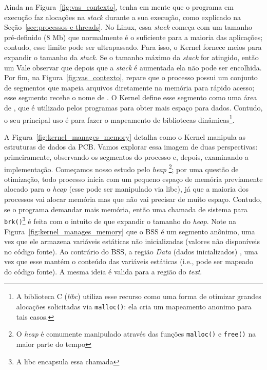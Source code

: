 Ainda na Figura~\ref{fig:vas_contexto}, tenha em mente que o programa em
execução faz alocações na \emph{stack} durante a sua execução, como explicado
na Seção~\ref{sec:processos-e-threads}. No Linux, essa \textit{stack} começa
com um tamanho pré-definido (8 Mb) que normalmente é o suficiente para a
maioria das aplicações; contudo, esse limite pode ser ultrapassado. Para isso, o
Kernel fornece meios para expandir o tamanho da \emph{stack}. Se o tamanho
máximo da \textit{stack} for atingido, então um 
 Vale observar que depois que a \textit{stack} é aumentada ela não pode
ser encolhida. Por fim, na Figura~\ref{fig:vas_contexto}, repare que o processo
possui um conjunto de segmentos que mapeia arquivos diretamente na memória para
rápido acesso; esse segmento recebe o nome de . O Kernel define esse segmento como uma área de
, que é utilizado pelos programas
para obter mais espaço para dados. Contudo, o seu principal uso é para fazer o
mapeamento de bibliotecas dinâmicas\footnote{A biblioteca C (\textit{libc})
utiliza esse recurso como uma forma de otimizar grandes alocações solicitadas
via \texttt{malloc()}: ela cria um mapeamento anonimo para tais
casos.}.

A Figura~\ref{fig:kernel_manages_memory} detalha
como o Kernel manipula as estruturas de dados da PCB. Vamos explorar essa
imagem de duas perspectivas: primeiramente, observando os segmentos do processo
e, depois, examinando a implementação. Começamos nosso estudo pelo \textit{heap}
\footnote{O \emph{heap} é comumente manipulado através das funções \texttt{malloc()} e
\texttt{free()} na maior parte do tempo}; por uma questão de otimização, todo
processo inicia com um pequeno espaço de memória previamente alocado para o \textit{heap}
(esse pode ser manipulado via libc), já que a maioria dos
processos vai alocar memória mas que não vai precisar de muito espaço.
Contudo, se o programa demandar mais memória, então uma chamada de sistema para
\texttt{brk()}\footnote{A libc encapsula essa chamada} é feita com o intuito de
que expandir o tamanho do \textit{heap}. Note na
Figura~\ref{fig:kernel_manages_memory} que o BSS é um segmento anônimo, uma
vez que ele armazena variáveis estáticas não inicializadas (valores não
disponíveis no código fonte). Ao contrário do BSS, a região \emph{Data} (dados
inicializados) , uma vez que esse mantém o conteúdo das
variáveis estáticas (i.e., pode ser mapeado do código fonte). A mesma ideia é
valida para a região do \textit{text}.

